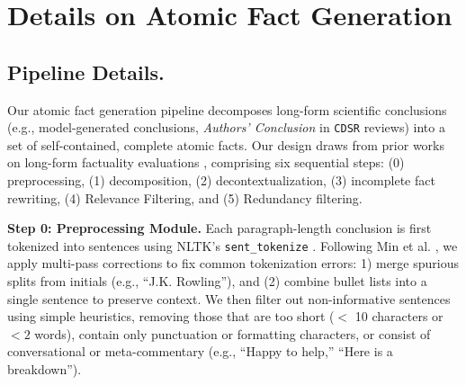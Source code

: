 \documentclass{article}
\newcommand{\xhdr}[1]{%
  \noindent\textbf{#1.}
}
\begin{document}


\section{Details on Atomic Fact Generation}

\subsection{Pipeline Details.}\label{appendix:afg-pipeline} Our atomic fact generation pipeline decomposes long-form scientific conclusions (e.g., model-generated conclusions, \textit{Authors' Conclusion} in \texttt{CDSR} reviews) into a set of self-contained, complete atomic facts. Our design draws from prior works on long-form factuality evaluations \cite{min-etal-2023-factscore, 10.5555/3737916.3740483, liu-etal-2025-verifact}, comprising six sequential steps: (0) preprocessing, (1) decomposition, (2) decontextualization, (3) incomplete fact rewriting, (4) Relevance Filtering, and (5) Redundancy filtering. 

\xhdr{Step 0: Preprocessing Module} Each paragraph-length conclusion is first tokenized into sentences using NLTK's \texttt{sent\_tokenize} \cite{bird-loper-2004-nltk}. Following Min et al. \cite{min-etal-2023-factscore}, we apply multi-pass corrections to fix common tokenization errors: 1) merge spurious splits from initials (e.g., ``J.K. Rowling''), and (2) combine bullet lists into a single sentence to preserve context. We then filter out non-informative sentences using simple heuristics, removing those that are too short ($<$ 10 characters or $<2$ words), contain only punctuation or formatting characters, or consist of conversational or meta-commentary (e.g., ``Happy to help,'' ``Here is a breakdown'').
\end{document}
